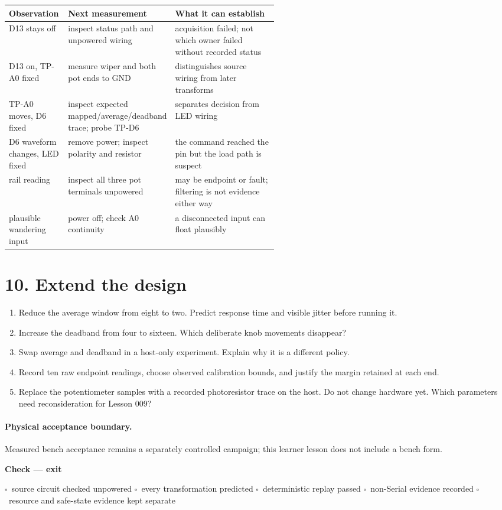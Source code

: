 \documentclass[11pt]{article}
\newcommand{\checkbox}{\(\square\)}
\newenvironment{checkpoint}[1]
{\begin{center}\begin{minipage}{0.94\linewidth}\textbf{Check --- #1}\par}
{\end{minipage}\end{center}}
\begin{document}
\begin{tabularx}{\linewidth}{@{}p{0.22\linewidth}p{0.31\linewidth}X@{}}
\toprule
Observation & Next measurement & What it can establish\\
\midrule
D13 stays off & inspect status path and unpowered wiring & acquisition failed;
not which owner failed without recorded status\\
D13 on, TP-A0 fixed & measure wiper and both pot ends to GND & distinguishes
source wiring from later transforms\\
TP-A0 moves, D6 fixed & inspect expected mapped/average/deadband trace;
probe TP-D6 & separates decision from LED wiring\\
D6 waveform changes, LED fixed & remove power; inspect polarity and resistor &
the command reached the pin but the load path is suspect\\
rail reading & inspect all three pot terminals unpowered & may be endpoint or
fault; filtering is not evidence either way\\
plausible wandering input & power off; check A0 continuity & a disconnected
input can float plausibly\\
\bottomrule
\end{tabularx}

\section*{10. Extend the design}

\begin{enumerate}
    \item Reduce the average window from eight to two. Predict response time and
          visible jitter before running it.
    \item Increase the deadband from four to sixteen. Which deliberate knob
          movements disappear?
    \item Swap average and deadband in a host-only experiment. Explain why it
          is a different policy.
    \item Record ten raw endpoint readings, choose observed calibration bounds,
          and justify the margin retained at each end.
    \item Replace the potentiometer samples with a recorded photoresistor trace
          on the host. Do not change hardware yet. Which parameters need
          reconsideration for Lesson 009?
\end{enumerate}

\paragraph{Physical acceptance boundary.}
Measured bench acceptance remains a separately controlled campaign; this
learner lesson does not include a bench form.
\begin{checkpoint}{exit}
\checkbox\ source circuit checked unpowered \quad
\checkbox\ every transformation predicted \quad
\checkbox\ deterministic replay passed \quad
\checkbox\ non-Serial evidence recorded \quad
\checkbox\ resource and safe-state evidence kept separate
\end{checkpoint}
\end{document}
